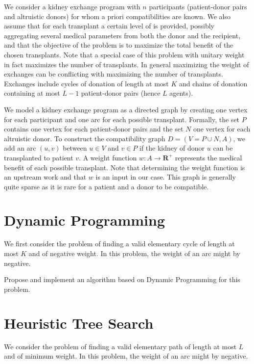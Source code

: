 \documentclass[a4paper,twocolumn]{article}
\newcommand{\R}{\mathbf{R}}
\begin{document}
We consider a kidney exchange program with $n$ participants (patient-donor pairs and altruistic donors) for whom a priori compatibilities are known. We also assume that for each transplant a certain level of  is provided, possibly aggregating several medical parameters from both the donor and the recipient, and that the objective of the problem is to maximize the total benefit of the chosen transplants. Note that a special case of this problem with unitary weight in fact maximizes the number of transplants. In general maximizing the weight of exchanges can be conflicting with maximizing the number of transplants. Exchanges include cycles of donation of length at most $K$ and chains of donation containing at most $L - 1$ patient-donor pairs (hence $L$ agents).

We model a kidney exchange program as a directed graph by creating one vertex for each participant and one arc for each possible transplant. Formally, the set $P$ contains one vertex for each patient-donor pairs and the set $N$ one vertex for each altruistic donor. To construct the compatibility graph $D = (V = P \cup N, A)$, we add an arc $(u, v)$ between $u \in V$ and $v \in P$ if the kidney of donor $u$ can be transplanted to patient $v$. A weight function $w: A \to \R^+$ represents the medical benefit of each possible transplant. Note that determining the weight function is an upstream work and that $w$ is an input in our case. This graph is generally quite sparse as it is rare for a patient and a donor to be compatible.

\section{Dynamic Programming}

We first consider the problem of finding a valid elementary cycle of length at most $K$ and of negative weight. In this problem, the weight of an arc might by negative.

Propose and implement an algorithm based on Dynamic Programming for this problem.

\section{Heuristic Tree Search}

We consider the problem of finding a valid elementary path of length at most $L$ and of minimum weight. In this problem, the weight of an arc might by negative.
\end{document}
